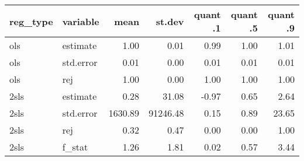 \begin{tabular}{llrrrrr}
  \hline
reg\_type & variable & mean & st.dev & quant .1 & quant .5 & quant .9 \\ 
  \hline
ols & estimate & 1.00 & 0.01 & 0.99 & 1.00 & 1.01 \\ 
  ols & std.error & 0.01 & 0.00 & 0.01 & 0.01 & 0.01 \\ 
  ols & rej & 1.00 & 0.00 & 1.00 & 1.00 & 1.00 \\ 
  2sls & estimate & 0.28 & 31.08 & -0.97 & 0.65 & 2.64 \\ 
  2sls & std.error & 1630.89 & 91246.48 & 0.15 & 0.89 & 23.65 \\ 
  2sls & rej & 0.32 & 0.47 & 0.00 & 0.00 & 1.00 \\ 
  2sls & f\_stat & 1.26 & 1.81 & 0.02 & 0.57 & 3.44 \\ 
   \hline
\end{tabular}
